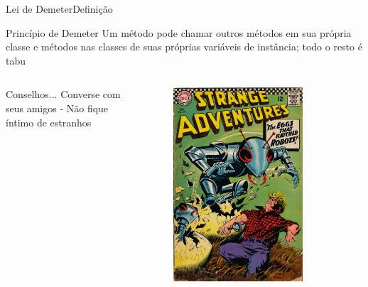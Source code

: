\documentclass[10pt]{beamer}
\begin{document}
\begin{frame}{Lei de Demeter}{Definição}

  \begin{block}{Princípio de Demeter}
    Um método pode chamar outros métodos em sua própria classe e métodos nas classes de suas próprias variáveis de instância; todo o resto é tabu
    \end{block}

    \pause
    
    \begin{columns}[T]
      \begin{column}{.7\textwidth}
        \begin{block}{Conselhos...}
          Converse com seus amigos - Não fique íntimo de estranhos
        \end{block}

        \end{column}
        \hfill
        \begin{column}{.3\textwidth}
          \begin{figure}[ht]
          \centering
          \includegraphics[width=0.8\textwidth, keepaspectratio=true]{images/strange.jpg}
            \end{figure}
        \end{column}
    \end{columns}
\end{frame}
\end{document}
